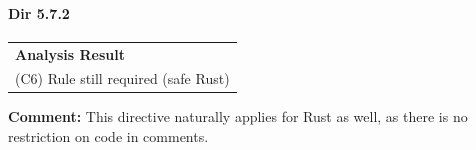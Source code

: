 \paragraph{Dir 5.7.2}
\begin{longtable}{p{13cm}}
\textbf{Analysis Result} \\
(C6) Rule still required (safe Rust) \\
\end{longtable}
\textbf{Comment:} This directive naturally applies for Rust as well, as there is no restriction on code in comments. \\

